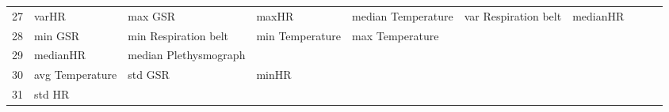 \begin{landscape}
\begin{table}[]
\begin{tabular}{l|llllllll}
27       & varHR                   & max GSR               & maxHR                   & median Temperature      & var Respiration belt    & medianHR              &                      &          &                      &        \\
28       & min GSR                 & min Respiration belt  & min Temperature         & max Temperature         &                         &                       &                      &          &                      &        \\
29       & medianHR                & median Plethysmograph &                         &                         &                         &                       &                      &          &                      &        \\
30       & avg Temperature         & std GSR               & minHR                   &                         &                         &                       &                      &          &                      &        \\
31       & std HR                  &                       &                         &                         &                         &                       &                      &          &                      &        \\
\end{tabular}
\end{table}
\end{landscape}
\clearpage
